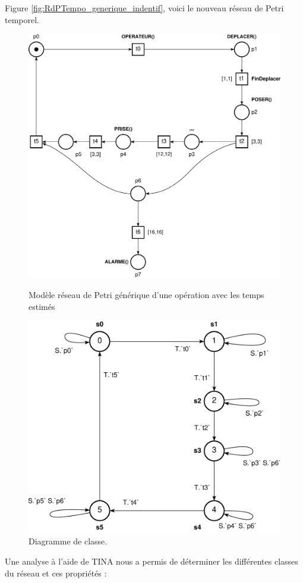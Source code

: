 Figure \ref{fig:RdPTempo_generique_indentif}, voici le nouveau réseau de Petri temporel.
\begin{figure}[!ht]
\begin{minipage}[t]{.58\textwidth}
\centering
\includegraphics[width=.8\textwidth]{./I/images/III-1_V3_esti.pdf}
\caption{\label{fig:RdPTempo_generique_indentif}Modèle réseau de Petri générique d'une opération avec les temps estimés}
\end{minipage}\hfill%
\begin{minipage}[t]{.42\textwidth}
\centering
\includegraphics[width=.9\textwidth]{./I/images/III-1_v3_aut.pdf}
\caption{\label{fig:III-1-automate}Diagramme de classe.}
\end{minipage}
\end{figure}
Une analyse à l'aide de TINA nous a permis de déterminer les différentes classes du réseau et ces propriétés : \\

